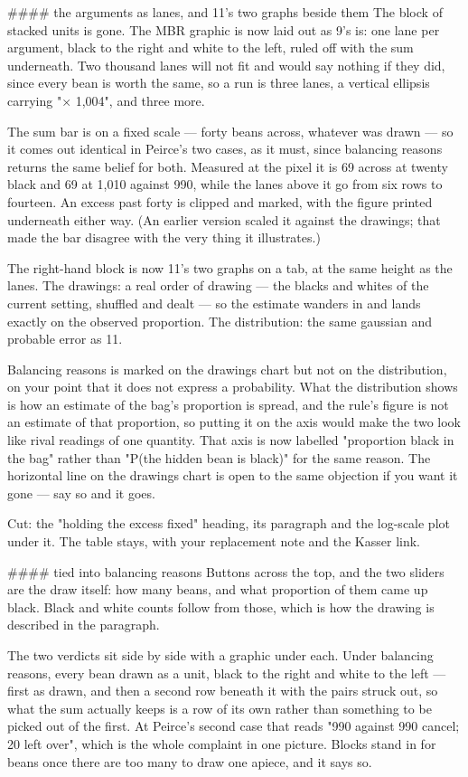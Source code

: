 #### the arguments as lanes, and 11's two graphs beside them
The block of stacked units is gone. The MBR graphic is now laid out as 9's is:
one lane per argument, black to the right and white to the left, ruled off with
the sum underneath. Two thousand lanes will not fit and would say nothing if
they did, since every bean is worth the same, so a run is three lanes, a
vertical ellipsis carrying "× 1,004", and three more.

The sum bar is on a fixed scale — forty beans across, whatever was drawn — so it
comes out identical in Peirce's two cases, as it must, since balancing reasons
returns the same belief for both. Measured at the pixel it is 69 across at
twenty black and 69 at 1,010 against 990, while the lanes above it go from six
rows to fourteen. An excess past forty is clipped and marked, with the figure
printed underneath either way. (An earlier version scaled it against the
drawings; that made the bar disagree with the very thing it illustrates.)

The right-hand block is now 11's two graphs on a tab, at the same height as the
lanes. The drawings: a real order of drawing — the blacks and whites of the
current setting, shuffled and dealt — so the estimate wanders in and lands
exactly on the observed proportion. The distribution: the same gaussian and
probable error as 11.

Balancing reasons is marked on the drawings chart but not on the distribution,
on your point that it does not express a probability. What the distribution
shows is how an estimate of the bag's proportion is spread, and the rule's
figure is not an estimate of that proportion, so putting it on the axis would
make the two look like rival readings of one quantity. That axis is now labelled
"proportion black in the bag" rather than "P(the hidden bean is black)" for the
same reason. The horizontal line on the drawings chart is open to the same
objection if you want it gone — say so and it goes.

Cut: the "holding the excess fixed" heading, its paragraph and the log-scale
plot under it. The table stays, with your replacement note and the Kasser link.

#### tied into balancing reasons
Buttons across the top, and the two sliders are the draw itself: how many beans,
and what proportion of them came up black. Black and white counts follow from
those, which is how the drawing is described in the paragraph.

The two verdicts sit side by side with a graphic under each. Under balancing
reasons, every bean drawn as a unit, black to the right and white to the left —
first as drawn, and then a second row beneath it with the pairs struck out, so
what the sum actually keeps is a row of its own rather than something to be
picked out of the first. At Peirce's second case that reads "990 against 990
cancel; 20 left over", which is the whole complaint in one picture. Blocks stand
in for beans once there are too many to draw one apiece, and it says so.

